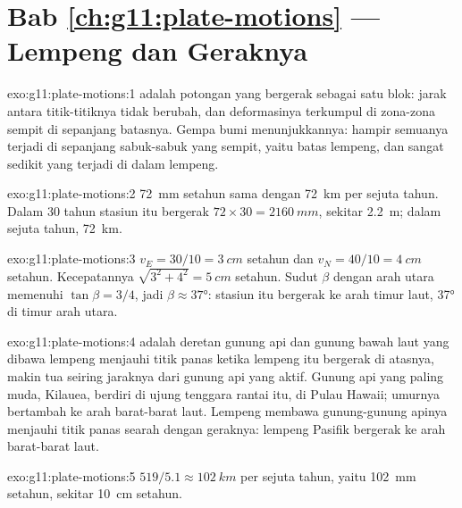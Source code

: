 \section*{Bab \ref{ch:g11:plate-motions} --- Lempeng dan Geraknya}

\begin{solution}{exo:g11:plate-motions:1}
 adalah potongan  yang bergerak sebagai satu blok: jarak
antara titik-titiknya tidak berubah, dan deformasinya terkumpul di zona-zona
sempit di sepanjang batasnya. Gempa bumi menunjukkannya: hampir semuanya terjadi
di sepanjang sabuk-sabuk yang sempit, yaitu batas lempeng, dan sangat sedikit
yang terjadi di dalam lempeng.
\end{solution}

\begin{solution}{exo:g11:plate-motions:2}
\qty{72}{mm} setahun sama dengan \qty{72}{km} per sejuta tahun. Dalam 30 tahun
stasiun itu bergerak $72 \times 30 = \qty{2160}{mm}$, sekitar \qty{2.2}{m};
dalam sejuta tahun, \qty{72}{km}.
\end{solution}

\begin{solution}{exo:g11:plate-motions:3}
$v_E = 30/10 = \qty{3}{cm}$ setahun dan $v_N = 40/10 = \qty{4}{cm}$ setahun.
Kecepatannya $\sqrt{3^2 + 4^2} = \qty{5}{cm}$ setahun. Sudut $\beta$ dengan
arah utara memenuhi $\tan\beta = 3/4$, jadi $\beta \approx \ang{37}$: stasiun
itu bergerak ke arah timur laut, \ang{37} di timur arah utara.
\end{solution}

\begin{solution}{exo:g11:plate-motions:4}
 adalah deretan gunung api dan gunung bawah laut yang dibawa
lempeng menjauhi titik panas ketika lempeng itu bergerak di atasnya, makin tua
seiring jaraknya dari gunung api yang aktif. Gunung api yang paling muda,
Kilauea, berdiri di ujung tenggara rantai itu, di Pulau Hawaii; umurnya
bertambah ke arah barat-barat laut. Lempeng membawa gunung-gunung apinya
menjauhi titik panas searah dengan geraknya: lempeng Pasifik bergerak ke arah
barat-barat laut.
\end{solution}

\begin{solution}{exo:g11:plate-motions:5}
$519/5.1 \approx \qty{102}{km}$ per sejuta tahun, yaitu \qty{102}{mm}
setahun, sekitar \qty{10}{cm} setahun.
\end{solution}

